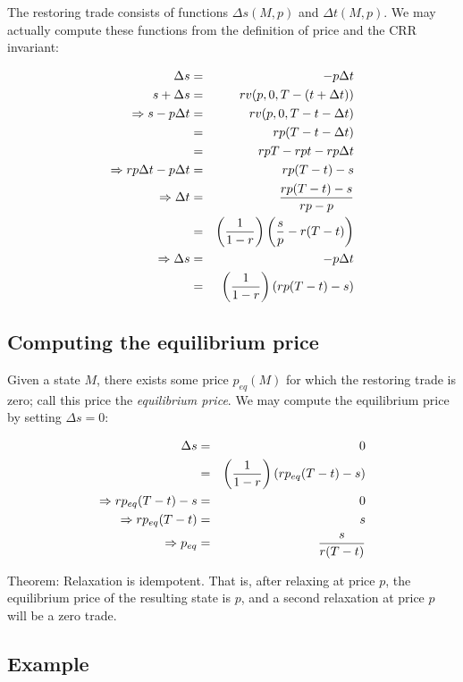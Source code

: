 \documentclass{article}
\begin{document}
The restoring trade consists of functions $\Delta s(M, p)$ and $\Delta t(M, p)$.
We may actually compute these functions from the definition of price and the
CRR invariant:

\begin{eqnarray*}
\Delta s & = & -p \Delta t \\
s + \Delta s & = & r v(p, 0, T-(t+\Delta t)) \\
\Rightarrow s - p \Delta t & = & r v(p, 0, T-t-\Delta t) \\
   & = & r p(T-t-\Delta t) \\
   & = & rpT - rpt - rp \Delta t \\
\Rightarrow r p \Delta t - p \Delta t & = & r p (T-t) - s \\
\Rightarrow \Delta t & = & {r p (T - t) - s \over rp - p } \\
                     & = & \left( {1 \over 1-r} \right) \left( {s \over p} - r (T-t) \right) \\
\Rightarrow \Delta s & = & - p \Delta t \\
   & = & \left( {1 \over 1-r} \right) \left( r p (T - t) - s \right)
\end{eqnarray*}

\subsection{Computing the equilibrium price}

Given a state $M$, there exists some price $p_{eq}(M)$ for which the restoring
trade is zero; call this price the \textit{equilibrium price}.  We may compute
the equilibrium price by setting $\Delta s = 0$:

\begin{eqnarray*}
\Delta s & = & 0 \\
& = & \left( {1 \over 1-r} \right) \left( r p_{eq} (T - t) - s \right) \\
\Rightarrow r p_{eq} (T - t) - s & = & 0 \\
\Rightarrow r p_{eq} (T - t) & = & s \\
\Rightarrow p_{eq} & = & {s \over r (T-t)}
\end{eqnarray*}

Theorem:  Relaxation is idempotent.  That is, after relaxing at price $p$,
the equilibrium price of the resulting state is $p$, and a second relaxation
at price $p$ will be a zero trade.

\subsection{Example}
\end{document}
